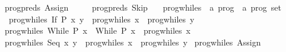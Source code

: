 \begin{isabellebody}
{}\ {}prog{}preds\ {}Assign\ {}\ {}{}\ {}\ {}{}{}\isanewline
{}\ {}prog{}preds\ Skip\ {}\ {}{}{}\isanewline
\isanewline
{}\isamarkupfalse%
\ prog{}whiles\ {}{}\ {}{}a\ prog\ {}\ {}a\ prog\ set{}\ \isanewline
\ \ {}prog{}whiles\ {}If\ P\ x\ y{}\ {}\ prog{}whiles\ x\ {}\ prog{}whiles\ y{}\isanewline
{}\ {}prog{}whiles\ {}While\ P\ x{}\ {}\ {}While\ P\ x{}\ {}\ prog{}whiles\ x{}\isanewline
{}\ {}prog{}whiles\ {}Seq\ x\ y{}\ {}\ prog{}whiles\ x\ {}\ prog{}whiles\ y{}\isanewline
{}\ {}prog{}whiles\ {}Assign\ {}\ {}{}\ {}\ {}{}{}\isanewline

\end{isabellebody}
